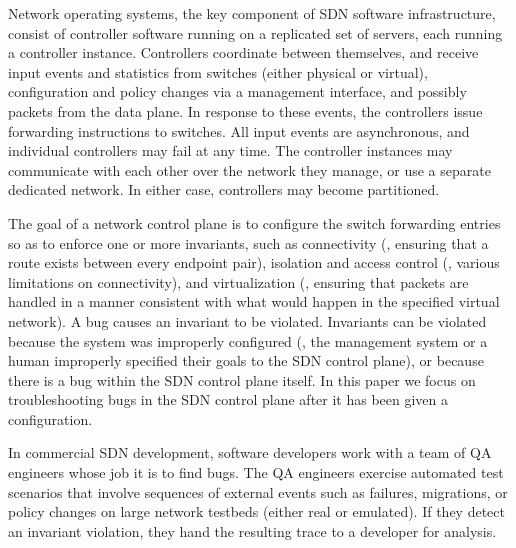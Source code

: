 %
Network operating systems, the key component of SDN software
infrastructure, consist of controller software running on a replicated set of
servers, each running a controller instance. Controllers coordinate between
themselves, and receive input events and
statistics from switches (either physical or virtual), configuration and
policy changes via a management interface, and possibly packets from the data
plane. In response to these events, the
controllers issue forwarding instructions to switches. All input
events are asynchronous, and individual controllers may fail at any
time. The controller instances may communicate
with each other over the network they manage, or use a separate dedicated
network. In either case, controllers may become partitioned.

The goal of a network control plane is to configure the switch forwarding entries so as to
enforce one or more invariants, such as connectivity (\ie, ensuring that a
route exists between every endpoint pair), isolation and access control (\ie, various limitations on
connectivity), and virtualization (\ie, ensuring that packets are handled
in a manner consistent with what would happen in the specified virtual
network). A bug causes an invariant to be violated. Invariants can be
violated because the system was improperly configured
(\eg, the management system \cite{quantum} or a human improperly specified their goals to the SDN control plane), or
because there is a bug within the SDN control plane itself. In this paper we focus on troubleshooting bugs in the
SDN control plane after it has been given a configuration.

In commercial SDN development, software developers work with a team of QA engineers whose
job it is to find bugs. The QA engineers exercise automated test scenarios that involve
sequences of external events such as failures, migrations, or policy changes
on large network testbeds (either real or emulated).
If they detect an invariant violation, they hand the resulting trace to a developer for analysis.

